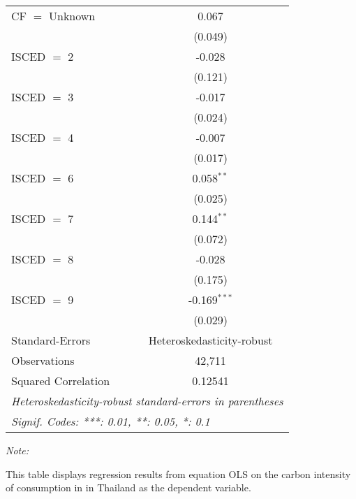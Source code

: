 \begin{table}[htbp!]
\begin{adjustbox}{width = 1\textwidth, max height = 0.95\textheight, center}
\begin{threeparttable}[b]
\begin{tabular}{lc}
            CF $=$ Unknown      & 0.067\\   
                                & (0.049)\\   
            ISCED $=$ 2         & -0.028\\   
                                & (0.121)\\   
            ISCED $=$ 3         & -0.017\\   
                                & (0.024)\\   
            ISCED $=$ 4         & -0.007\\   
                                & (0.017)\\   
            ISCED $=$ 6         & 0.058$^{**}$\\   
                                & (0.025)\\   
            ISCED $=$ 7         & 0.144$^{**}$\\   
                                & (0.072)\\   
            ISCED $=$ 8         & -0.028\\   
                                & (0.175)\\   
            ISCED $=$ 9         & -0.169$^{***}$\\   
                                & (0.029)\\   
            \midrule 
            Standard-Errors     & Heteroskedasticity-robust \\   
            Observations        & 42,711\\  
            Squared Correlation & 0.12541\\  
            \midrule \midrule
            \multicolumn{2}{l}{\emph{Heteroskedasticity-robust standard-errors in parentheses}}\\
            \multicolumn{2}{l}{\emph{Signif. Codes: ***: 0.01, **: 0.05, *: 0.1}}\\
         \end{tabular}
         
         \begin{tablenotes}\item \medskip \textit{Note:}
            \item This table displays regression results from equation OLS on the carbon intensity of consumption in  in Thailand as the dependent variable. 
         \end{tablenotes}
      \end{threeparttable}
   \end{adjustbox}
\end{table}


